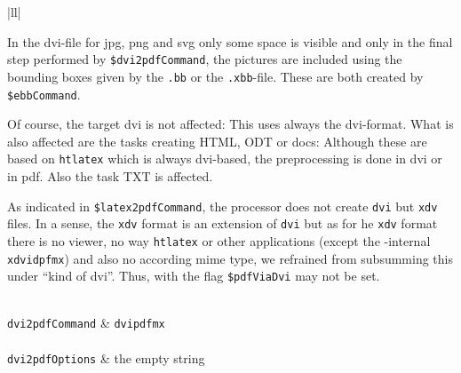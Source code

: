 \begin{longtable}{|ll|}
{\begin{minipage}{0.95\linewidth}
In the dvi-file for jpg, png and svg 
only some space is visible and only in the final step 
performed by \texttt{\$dvi2pdfCommand}, 
the pictures are included using the bounding boxes 
given by the \texttt{.bb} or the \texttt{.xbb}-file. 
These are both created by \texttt{\$ebbCommand}. 

Of course, the target dvi is not affected: 
This uses always the dvi-format. 
What is also affected are the tasks 
creating HTML, ODT or docs: 
Although these are based on \texttt{htlatex} which is always dvi-based, 
the preprocessing is done in dvi or in pdf. 
Also the task TXT is affected. 

As indicated in \texttt{\$latex2pdfCommand}, 
the processor \xelatex{} does not create \texttt{dvi} 
but \texttt{xdv} files. 
In a sense, the \texttt{xdv} format is an extension of \texttt{dvi} 
but as for he \texttt{xdv} format there is no viewer, 
no way \texttt{htlatex} or other applications (except the \xelatex-internal \texttt{xdvidpfmx}) 
and also no according mime type, 
we refrained from subsumming this under ``kind of dvi''. 
Thus, with \xelatex{} the flag \texttt{\$pdfViaDvi} may not be set. 

\end{minipage}
} \\
\texttt{dvi2pdfCommand}   & \texttt{dvipdfmx}         \\
 \\
\texttt{dvi2pdfOptions}   & the empty string          \\
\end{longtable}
